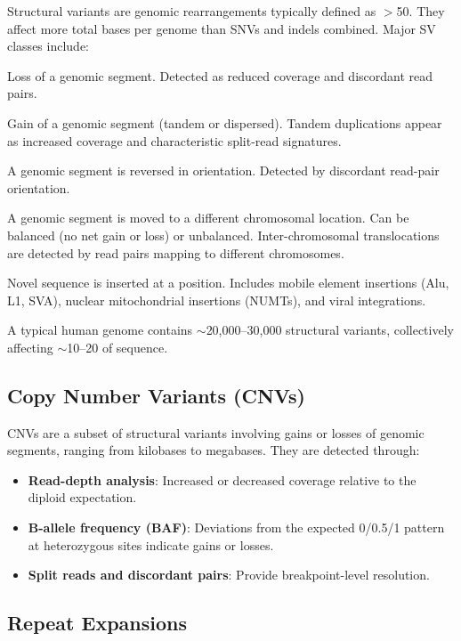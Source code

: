 Structural variants are genomic rearrangements typically defined as $>$50\basepair{}. They affect more total bases per genome than SNVs and indels combined. Major SV classes include:

\begin{description}[style=nextline]
  \item[Deletions] Loss of a genomic segment. Detected as reduced coverage and discordant read pairs.
  \item[Duplications] Gain of a genomic segment (tandem or dispersed). Tandem duplications appear as increased coverage and characteristic split-read signatures.
  \item[Inversions] A genomic segment is reversed in orientation. Detected by discordant read-pair orientation.
  \item[Translocations] A genomic segment is moved to a different chromosomal location. Can be balanced (no net gain or loss) or unbalanced. Inter-chromosomal translocations are detected by read pairs mapping to different chromosomes.
  \item[Insertions] Novel sequence is inserted at a position. Includes mobile element insertions (Alu, L1, SVA), nuclear mitochondrial insertions (NUMTs), and viral integrations.
\end{description}

A typical human genome contains $\sim$20,000--30,000 structural variants, collectively affecting $\sim$10--20\megabase{} of sequence.

\subsection{Copy Number Variants (CNVs)}

CNVs are a subset of structural variants involving gains or losses of genomic segments, ranging from kilobases to megabases. They are detected through:
\begin{itemize}[nosep]
  \item \textbf{Read-depth analysis}: Increased or decreased coverage relative to the diploid expectation.
  \item \textbf{B-allele frequency (BAF)}: Deviations from the expected 0/0.5/1 pattern at heterozygous sites indicate gains or losses.
  \item \textbf{Split reads and discordant pairs}: Provide breakpoint-level resolution.
\end{itemize}

\subsection{Repeat Expansions}


